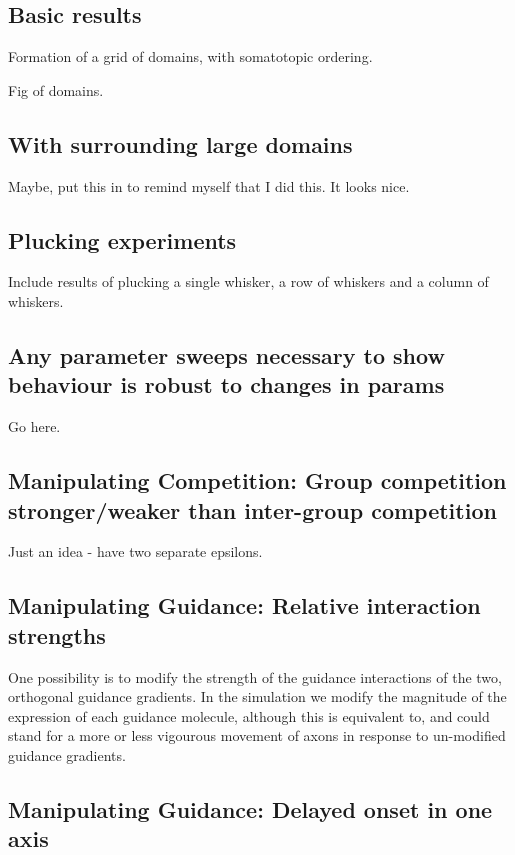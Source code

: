 \documentclass[a4paper,11pt]{article}
\begin{document}
\subsection*{Basic results}

Formation of a grid of domains, with somatotopic ordering.

Fig of domains.

\subsection*{With surrounding large domains}

Maybe, put this in to remind myself that I did this. It looks nice.

\subsection*{Plucking experiments}

Include results of plucking a single whisker, a row of whiskers and a
column of whiskers.

\subsection*{Any parameter sweeps necessary to show behaviour is
  robust to changes in params}

Go here.

\subsection*{Manipulating Competition: Group competition stronger/weaker than inter-group competition}

Just an idea - have two separate epsilons.

\subsection*{Manipulating Guidance: Relative interaction strengths}

One possibility is to modify the strength of the guidance interactions of the
two, orthogonal guidance gradients. In the simulation we modify the magnitude
of the expression of each guidance molecule, although this is equivalent to,
and could stand for a more or less vigourous movement of axons in response to
un-modified guidance gradients.

\subsection*{Manipulating Guidance: Delayed onset in one axis}
\end{document}

